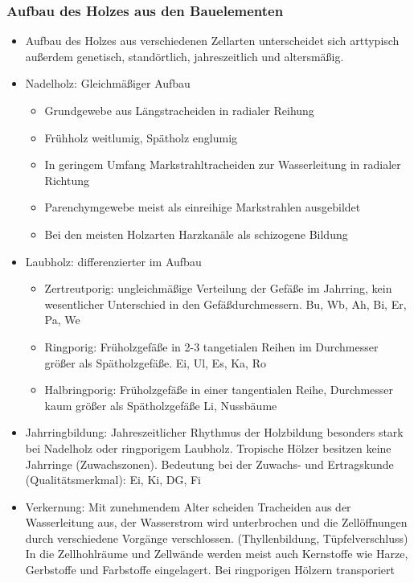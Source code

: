 \documentclass{article}
\begin{document}
\subsubsection{Aufbau des Holzes aus den Bauelementen}
\begin{itemize}
  \item Aufbau des Holzes aus verschiedenen Zellarten unterscheidet sich
  arttypisch außerdem genetisch, standörtlich, jahreszeitlich und altersmäßig.
  \item Nadelholz: Gleichmäßiger Aufbau
  \begin{itemize}
    \item Grundgewebe aus Längstracheiden in radialer Reihung
    \item Frühholz weitlumig, Spätholz englumig
    \item In geringem Umfang Markstrahltracheiden zur Wasserleitung in radialer Richtung
    \item Parenchymgewebe meist als einreihige Markstrahlen ausgebildet
    \item Bei den meisten Holzarten Harzkanäle als schizogene Bildung
  \end{itemize}
  \item Laubholz: differenzierter im Aufbau
  \begin{itemize}
    \item Zertreutporig: ungleichmäßige Verteilung der Gefäße im Jahrring,
    kein wesentlicher Unterschied in den Gefäßdurchmessern. Bu, Wb, Ah, Bi, Er, Pa, We
    \item Ringporig: Früholzgefäße in 2-3 tangetialen Reihen im Durchmesser
    größer als Spätholzgefäße. Ei, Ul, Es, Ka, Ro
    \item Halbringporig: Früholzgefäße in einer tangentialen Reihe,
    Durchmesser kaum größer als Spätholzgefäße Li, Nussbäume
  \end{itemize}
  \item Jahrringbildung: Jahreszeitlicher Rhythmus der Holzbildung besonders
  stark bei Nadelholz oder ringporigem Laubholz. Tropische Hölzer besitzen
  keine Jahrringe (Zuwachszonen). Bedeutung bei der Zuwachs- und Ertragskunde
  (Qualitätsmerkmal): Ei, Ki, DG, Fi
  \item Verkernung: Mit zunehmendem Alter scheiden Tracheiden  aus der
  Wasserleitung aus, der Wasserstrom wird unterbrochen und die Zellöffnungen
  durch verschiedene Vorgänge verschlossen. (Thyllenbildung, Tüpfelverschluss)
  In die Zellhohlräume und Zellwände werden meist auch Kernstoffe wie Harze,
  Gerbstoffe und Farbstoffe eingelagert. Bei ringporigen Hölzern transporiert

\end{itemize}
\end{document}
